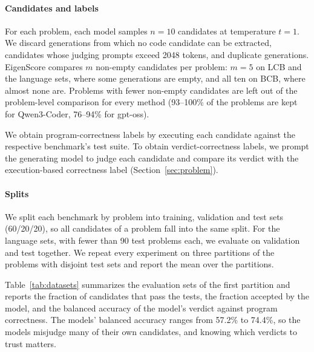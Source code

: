 \paragraph{Candidates and labels}
For each problem, each model samples $n = 10$ candidates at temperature $t=1$. We discard generations from which no code candidate can be extracted, candidates whose judging prompts exceed 2048 tokens, and duplicate generations.
EigenScore compares $m$ non-empty candidates per problem: $m = 5$ on LCB and
the language sets, where some generations are empty, and all ten on BCB,
where almost none are. Problems with fewer non-empty candidates are left out
of the problem-level comparison for every method (93--100\% of the problems
are kept for Qwen3-Coder, 76--94\% for gpt-oss).

We obtain program-correctness labels by executing each candidate against the respective benchmark's test suite. To obtain verdict-correctness labels, we prompt the generating model to judge each candidate and compare its verdict with the execution-based correctness label
(Section~\ref{sec:problem}).

\paragraph{Splits}
We split each benchmark by problem into training, validation and test sets (60/20/20), so all candidates of a problem fall into the same split. 
For the language sets, with fewer than 90 test problems each, we evaluate on validation and test together. 
We repeat every experiment on three partitions of the
problems with disjoint test sets and report the mean over the partitions.


Table~\ref{tab:datasets} summarizes the evaluation sets of the first
partition and reports the fraction of candidates that pass the tests, the
fraction accepted by the model, and the balanced accuracy of the model's
verdict against program correctness. The models' balanced accuracy ranges from
57.2\% to 74.4\%, so the models misjudge many of their own candidates, and
knowing which verdicts to trust matters.

